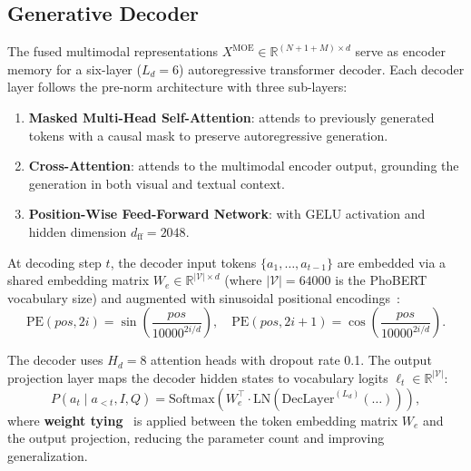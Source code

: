 \subsection{Generative Decoder}
\label{sec:method:decoder}

The fused multimodal representations $X^{\text{MOE}} \in \mathbb{R}^{(N+1+M) \times d}$ serve as encoder memory for a six-layer ($L_d = 6$) autoregressive transformer decoder. Each decoder layer follows the pre-norm architecture with three sub-layers:
\begin{enumerate}
    \item \textbf{Masked Multi-Head Self-Attention}: attends to previously generated tokens with a causal mask to preserve autoregressive generation.
    \item \textbf{Cross-Attention}: attends to the multimodal encoder output, grounding the generation in both visual and textual context.
    \item \textbf{Position-Wise Feed-Forward Network}: with GELU activation and hidden dimension $d_{\text{ff}} = 2048$.
\end{enumerate}

At decoding step $t$, the decoder input tokens $\{a_1, \ldots, a_{t-1}\}$ are embedded via a shared embedding matrix $W_e \in \mathbb{R}^{|\mathcal{V}| \times d}$ (where $|\mathcal{V}| = 64000$ is the PhoBERT vocabulary size) and augmented with sinusoidal positional encodings~\cite{vaswani2017attention}:
\begin{equation}
    \text{PE}(pos, 2i) = \sin\!\left(\frac{pos}{10000^{2i/d}}\right), \quad \text{PE}(pos, 2i+1) = \cos\!\left(\frac{pos}{10000^{2i/d}}\right).
\end{equation}

The decoder uses $H_d = 8$ attention heads with dropout rate 0.1. The output projection layer maps the decoder hidden states to vocabulary logits $\ell_t \in \mathbb{R}^{|\mathcal{V}|}$:
\begin{equation}
    P(a_t \mid a_{<t}, I, Q) = \text{Softmax}\!\left(W_e^\top \cdot \text{LN}\!\left(\text{DecLayer}^{(L_d)}(\ldots)\right)\right),
\end{equation}
where \textbf{weight tying}~\cite{press2017using} is applied between the token embedding matrix $W_e$ and the output projection, reducing the parameter count and improving generalization.

